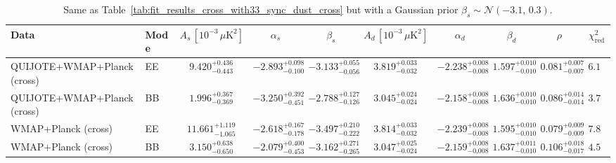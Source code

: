 \begin{table}[h]
\centering
\scriptsize
\setlength{\tabcolsep}{4pt}
\caption{Same as Table~\ref{tab:fit_results_cross_with33_sync_dust_cross} but with a Gaussian prior $\beta_s \sim \mathcal{N}(-3.1,\,0.3)$.}
\label{tab:fit_results_cross_with33_sync_dust_cross_prior_betas}
\begin{tabular}{llcccccccc}
\toprule
Data & Mode & $A_s\,[10^{-3}\,\mu\mathrm{K}^2]$ & $\alpha_s$ & $\beta_s$ & $A_d\,[10^{-3}\,\mu\mathrm{K}^2]$ & $\alpha_d$ & $\beta_d$ & $\rho$ & $\chi^2_\mathrm{red}$ \\
\midrule
QUIJOTE+WMAP+Planck (cross) & EE & $9.420^{+0.436}_{-0.443}$ & $-2.893^{+0.098}_{-0.100}$ & $-3.133^{+0.055}_{-0.056}$ & $3.819^{+0.033}_{-0.032}$ & $-2.238^{+0.008}_{-0.008}$ & $1.597^{+0.010}_{-0.010}$ & $0.081^{+0.007}_{-0.007}$ & $6.11$ \\
QUIJOTE+WMAP+Planck (cross) & BB & $1.996^{+0.367}_{-0.369}$ & $-3.250^{+0.392}_{-0.451}$ & $-2.788^{+0.127}_{-0.126}$ & $3.045^{+0.024}_{-0.024}$ & $-2.158^{+0.008}_{-0.008}$ & $1.636^{+0.010}_{-0.010}$ & $0.086^{+0.014}_{-0.014}$ & $3.74$ \\
WMAP+Planck (cross) & EE & $11.661^{+1.119}_{-1.065}$ & $-2.618^{+0.167}_{-0.178}$ & $-3.497^{+0.210}_{-0.222}$ & $3.814^{+0.033}_{-0.032}$ & $-2.239^{+0.008}_{-0.008}$ & $1.595^{+0.010}_{-0.010}$ & $0.079^{+0.009}_{-0.009}$ & $7.81$ \\
WMAP+Planck (cross) & BB & $3.150^{+0.638}_{-0.650}$ & $-2.079^{+0.400}_{-0.453}$ & $-3.162^{+0.271}_{-0.265}$ & $3.047^{+0.025}_{-0.024}$ & $-2.159^{+0.008}_{-0.008}$ & $1.637^{+0.011}_{-0.010}$ & $0.106^{+0.018}_{-0.017}$ & $4.52$ \\
\bottomrule
\end{tabular}
\end{table}
